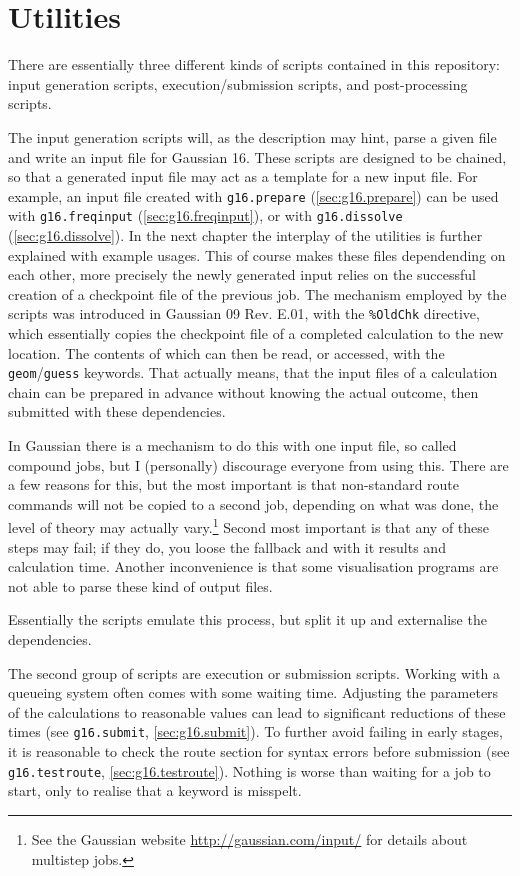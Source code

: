 \documentclass[   %
  final,          %
  a4paper         %
]{article}
\begin{document}
\section{Utilities}

There are essentially three different kinds of scripts contained in this repository:
input generation scripts, execution/submission scripts, and post-processing scripts.

The input generation scripts will, as the description may hint,
parse a given file and write an input file for Gaussian 16.
These scripts are designed to be chained, 
so that a generated input file may act as a template for a new input file. 
For example, an input file created with \lstinline`g16.prepare` (\ref{sec:g16.prepare})
can be used with \lstinline`g16.freqinput` (\ref{sec:g16.freqinput}), or
with \lstinline`g16.dissolve` (\ref{sec:g16.dissolve}).
In the next chapter the interplay of the utilities is further explained with example usages.
This of course makes these files dependending on each other,
more precisely the newly generated input relies on the successful creation
of a checkpoint file of the previous job.
The mechanism employed by the scripts was introduced in Gaussian 09 Rev. E.01,
with the \texttt{\%OldChk} directive, which essentially copies the checkpoint file
of a completed calculation to the new location.
The contents of which can then be read, or accessed, with the \texttt{geom}/\texttt{guess} keywords.
That actually means, that the input files of a calculation chain can be
prepared in advance without knowing the actual outcome,
then submitted with these dependencies.

In Gaussian there is a mechanism to do this with one input file,
so called compound jobs, but I (personally) discourage everyone from using this.
There are a few reasons for this, but the most important is that non-standard 
route commands will not be copied to a second job,
depending on what was done, the level of theory may actually vary.\footnote{%
  See the Gaussian website 
  \href{http://gaussian.com/input/?tabid=1}{http://gaussian.com/input/}
  for details about multistep jobs.}
Second most important is that any of these steps may fail;
if they do, you loose the fallback and with it results and calculation time.
Another inconvenience is that some visualisation programs are not able to
parse these kind of output files.

Essentially the scripts emulate this process, but split it up and externalise the dependencies.

The second group of scripts are execution or submission scripts.
Working with a queueing system often comes with some waiting time.
Adjusting the parameters of the calculations to reasonable values
can lead to significant reductions of these times 
(see \lstinline`g16.submit`, \ref{sec:g16.submit}).
To further avoid failing in early stages, it is reasonable to check the route section
for syntax errors before submission (see \lstinline`g16.testroute`, \ref{sec:g16.testroute}).
Nothing is worse than waiting for a job to start, only to realise that a keyword is misspelt.
\end{document}
